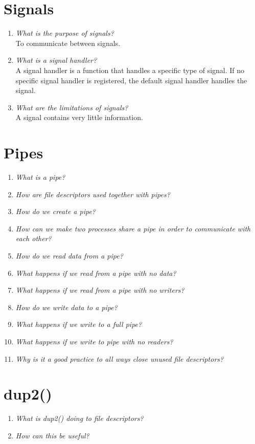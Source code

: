 \documentclass[a4paper]{article}
\begin{document}
\section{Signals}
\begin{enumerate}
  \item \textit{What is the purpose of signals?} \\
    To communicate between signals.
  \item \textit{What is a signal handler?} \\
    A signal handler is a function that handles a specific type of signal. If no specific signal handler is registered, the default signal handler handles the signal.
  \item \textit{What are the limitations of signals?} \\
    A signal contains very little information.
\end{enumerate}

\section{Pipes}
\begin{enumerate}
  \item \textit{What is a pipe?}
  \item \textit{How are file descriptors used together with pipes?}
  \item \textit{How do we create a pipe?}
  \item \textit{How can we make two processes share a pipe in order to communicate with each other?}
  \item \textit{How do we read data from a pipe?}
  \item \textit{What happens if we read from a pipe with no data?}
  \item \textit{What happens if we read from a pipe with no writers?}
  \item \textit{How do we write data to a pipe?}
  \item \textit{What happens if we write to a full pipe?}
  \item \textit{What happens if we write to pipe with no readers?}
  \item \textit{Why is it a good practice to all ways close unused file descriptors?}
\end{enumerate}

\section{dup2()}
\begin{enumerate}
  \item \textit{What is dup2() doing to file descriptors?}
  \item \textit{How can this be useful?}
\end{enumerate}
\end{document}
